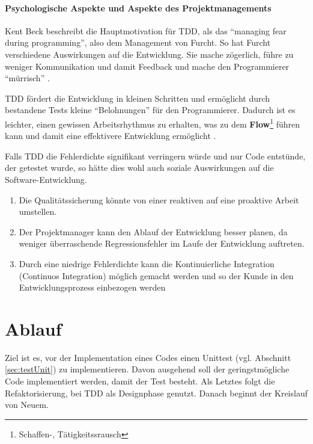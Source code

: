  \paragraph{Psychologische Aspekte und Aspekte des Projektmanagements}

  Kent Beck beschreibt die Hauptmotivation für TDD, als das "`managing fear during programming"', also dem Management von Furcht. So hat Furcht verschiedene Auswirkungen auf die Entwicklung. Sie mache zögerlich, führe zu weniger Kommunikation und damit Feedback und mache den Programmierer "`mürrisch"' \citep[S. xi]{beck_test_2002}.


  TDD fördert die Entwicklung in kleinen Schritten und ermöglicht durch bestandene Tests kleine "`Belohnungen"' für den Programmierer. Dadurch ist es leichter, einen gewissen Arbeitsrhythmus zu erhalten, was zu dem \textbf{Flow}\footnote{Schaffen-, Tätigkeitssrausch} führen kann und damit eine effektivere Entwicklung ermöglicht \citep{roger_brown_test_2008}.

  Falls TDD die Fehlerdichte signifikant verringern würde und nur Code entstünde, der getestet wurde, so hätte dies wohl auch soziale Auswirkungen auf die Software-Entwicklung\citep[S. x]{beck_test_2002}.
  \begin{enumerate}
   \item Die Qualitätssicherung könnte von einer reaktiven auf eine proaktive Arbeit umstellen.
   \item Der Projektmanager kann den Ablauf der Entwicklung besser planen, da weniger überraschende Regressionsfehler im Laufe der Entwicklung auftreten.
   \item Durch eine niedrige Fehlerdichte kann die Kontinuierliche Integration (Continuos Integration) möglich gemacht werden und so der Kunde in den Entwicklungsprozess einbezogen werden
  \end{enumerate}



\section{Ablauf}
  Ziel ist es, vor der Implementation eines Codes einen Unittest (vgl. Abschnitt \ref{sec:testUnit}) zu implementieren. Davon ausgehend soll der geringstmögliche Code implementiert werden, damit der Test besteht. Als Letztes folgt die Refaktorisierung, bei TDD als Designphase genutzt. Danach beginnt der Kreislauf von Neuem.

